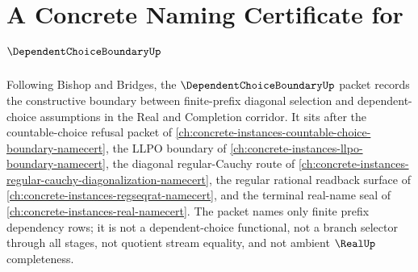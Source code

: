 \chapter{A Concrete Naming Certificate for $\DependentChoiceBoundaryUp$}
\label{ch:concrete-instances-dependent-choice-boundary-namecert}

Following Bishop and Bridges, the $\DependentChoiceBoundaryUp$ packet records the constructive boundary between finite-prefix diagonal selection and dependent-choice assumptions in the Real and Completion corridor. It sits after the countable-choice refusal packet of \autoref{ch:concrete-instances-countable-choice-boundary-namecert}, the LLPO boundary of \autoref{ch:concrete-instances-llpo-boundary-namecert}, the diagonal regular-Cauchy route of \autoref{ch:concrete-instances-regular-cauchy-diagonalization-namecert}, the regular rational readback surface of \autoref{ch:concrete-instances-regseqrat-namecert}, and the terminal real-name seal of \autoref{ch:concrete-instances-real-namecert}. The packet names only finite prefix dependency rows; it is not a dependent-choice functional, not a branch selector through all stages, not quotient stream equality, and not ambient $\RealUp$ completeness.

